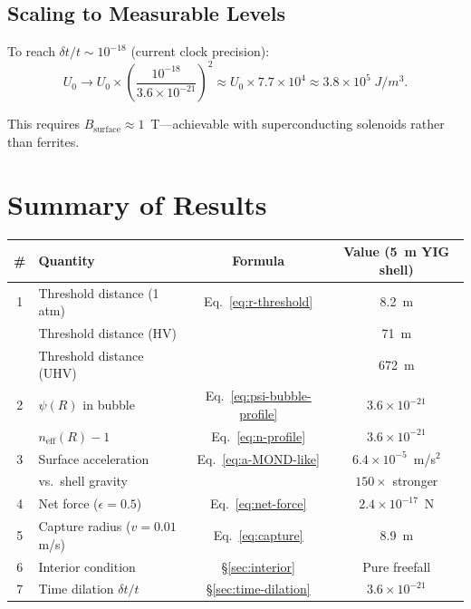 \documentclass[amsmath,amssymb,aps,prd,superscriptaddress,nofootinbib]{revtex4-2}
\begin{document}
\subsection{Scaling to Measurable Levels}

To reach $\delta t / t \sim 10^{-18}$ (current clock precision):
\begin{equation}
U_0 \to U_0 \times \left(\frac{10^{-18}}{3.6 \times 10^{-21}}\right)^2
\approx U_0 \times 7.7 \times 10^4 \approx 3.8 \times 10^5 \; \si{J/m^3}.
\end{equation}

This requires $B_\text{surface} \approx 1$~T---achievable with
superconducting solenoids rather than ferrites.

\section{Summary of Results}\label{sec:summary}

\begin{center}
\renewcommand{\arraystretch}{1.3}
\begin{tabular}{clcc}
\toprule
\# & Quantity & Formula & Value (5~m YIG shell) \\
\midrule
1 & Threshold distance (1 atm) & Eq.~\eqref{eq:r-threshold} & 8.2~m \\
  & Threshold distance (HV) & & 71~m \\
  & Threshold distance (UHV) & & 672~m \\
2 & $\psi(R)$ in bubble & Eq.~\eqref{eq:psi-bubble-profile} & $3.6 \times 10^{-21}$ \\
  & $n_\text{eff}(R) - 1$ & Eq.~\eqref{eq:n-profile} & $3.6 \times 10^{-21}$ \\
3 & Surface acceleration & Eq.~\eqref{eq:a-MOND-like} & $6.4 \times 10^{-5}$~m/s$^2$ \\
  & vs.\ shell gravity & & $150 \times$ stronger \\
4 & Net force ($\epsilon = 0.5$) & Eq.~\eqref{eq:net-force} & $2.4 \times 10^{-17}$~N \\
5 & Capture radius ($v = 0.01$ m/s) & Eq.~\eqref{eq:capture} & 8.9~m \\
6 & Interior condition & \S\ref{sec:interior} & Pure freefall \\
7 & Time dilation $\delta t / t$ & \S\ref{sec:time-dilation} & $3.6 \times 10^{-21}$ \\
\bottomrule
\end{tabular}
\end{center}
\end{document}
